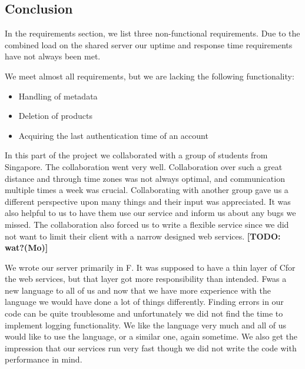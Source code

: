 \subsection{Conclusion}
\label{serverconclusion}
In the requirements section, we list three non-functional requirements. Due to the combined load on the shared server our uptime and response time requirements have not always been met.

We meet almost all requirements, but we are lacking the following functionality:
\begin{itemize}
\item Handling of metadata
\item Deletion of products
\item Acquiring the last authentication time of an account
\end{itemize}

In this part of the project we collaborated with a group of students from Singapore. The collaboration went very well. Collaboration over such a great distance and through time zones was not always optimal, and communication multiple times a week was crucial.
Collaborating with another group gave us a different perspective upon many things and their input was appreciated. It was also helpful to us to have them use our service and inform us about any bugs we missed.
The collaboration also forced us to write a flexible service since we did not want to limit their client with a narrow designed web services. \textbf{[TODO: wat?(Mo)]}

We wrote our server primarily in F\Sh. It was supposed to have a thin layer of C\Sh for the web services, but that layer got more responsibility than intended. 
F\Sh was a new language to all of us and now that we have more experience with the language we would have done a lot of things differently. Finding errors in our code can be quite troublesome and unfortunately we did not find the time to implement logging functionality. We like the language very much and all of us would like to use the language, or a similar one, again sometime. We also get the impression that our services run very fast though we did not write the code with performance in mind.
\newpage
